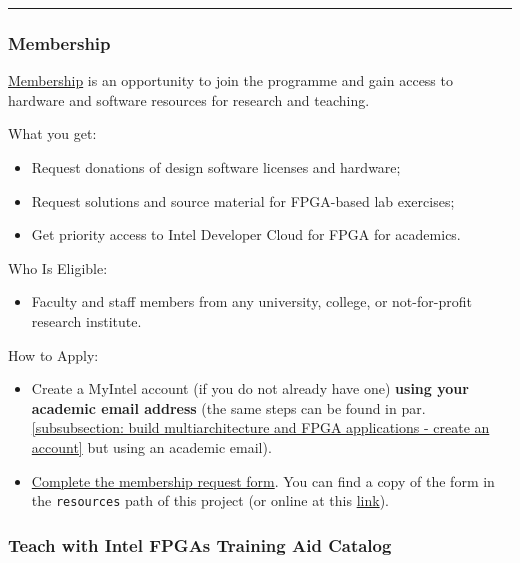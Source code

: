 \documentclass[a4paper]{article}
\newcommand{\longline}{\noindent\rule{\textwidth}{0.4pt}}
\begin{document}
    \longline

    \subsubsection{Membership}

    \href{https://www.intel.com/content/www/us/en/developer/topic-technology/fpga-academic/membership.html}{Membership} is an opportunity to join the programme and gain access to hardware and software resources for research and teaching.\newline

    \noindent
    What you get:
    \begin{itemize}
        \item Request donations of design software licenses and hardware;
        \item Request solutions and source material for FPGA-based lab exercises;
        \item Get priority access to Intel Developer Cloud for FPGA for academics.
    \end{itemize}
    Who Is Eligible:
    \begin{itemize}
        \item Faculty and staff members from any university, college, or not-for-profit research institute.
    \end{itemize}
    How to Apply:
    \begin{itemize}
        \item Create a MyIntel account (if you do not already have one) \textbf{using your academic email address} (the same steps can be found in par. \ref{subsubsection: build multiarchitecture and FPGA applications - create an account} but using an academic email).

        \item \href{https://www.intel.com/content/www/us/en/secure/forms/developer/fpga-academic-enrollment/request.html}{Complete the membership request form}. You can find a copy of the form in the \texttt{resources} path of this project (or online at this \href{https://github.com/AndreVale69/FPGA-project-presentation/tree/main/resources/Apply%20for%20membership%20-%20Intel.pdf}{link}).
    \end{itemize}\newpage

    \subsubsection{Teach with Intel FPGAs Training Aid Catalog}
\end{document}
